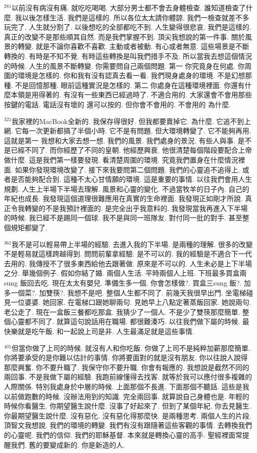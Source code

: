 \documentclass{book}
\begin{document}
$^{281}$以前沒有病沒有痛.
就吃吃喝喝.
大部分男士都不會去身體檢查.
誰知道檢查了什麼.
我以後怎樣生活.
我們是這樣的.
所以各位太太請你體諒.
我們一檢查就差不多玩完了.
人生就分割了.
以後想吃的全部都吃不到.
人生變得很悲哀.
我們是這樣的.
真正的改變不是那些順其自然.
而是我們掌握不到.
頂尖我想說的第一件事.
關於風景的轉變.
就是不論你喜歡不喜歡.
主動或者被動.
有心或者無意.
這些場景是不斷轉換的.
有時是不知不覺.
有時這些轉換是叫我們措手不及.
所以當我去想這個情況的時候.
人生的風景不斷轉變.
你需要問自己兩個問題.
第一 你究竟身在何處.
你周圍的環境是怎樣的.
你和我有沒有認真去看一看.
我們現身處身的環境.
不是幻想那種.
不是回憶那種.
眼前這種實況是怎樣的.
第二 你處身在這種環境裡面.
你還有什麼本領是用得著的.
有沒有一些東西已經過時了.
不適合用的.
大家還會不會用那些按鍵的電話.
電話沒有壞的 還可以按的.
但你會不會用的.
不會用的 為什麼.

$^{321}$我家裡的MacBook全新的.
我保存得很好.
但我都要賣掉它.
為什麼.
它追不到上網.
它每一次更新都搞了半個小時.
它不是有問題.
但大環境轉變了.
它不能夠再用.
這就是第一 我想和大家去想一想.
我們的風景.
我們處身的景況.
有些人與事.
是不是已經不同了.
而你經歷了不同的皇朝.
他經歷興衰.
他很清楚每個階段要配合上帝做什麼.
這是我們第一樣要發現.
看清楚周圍的環境.
究竟我們置身在什麼情況裡面.
如果你發現環境改變了.
接下來我要問第二個問題.
我們的心靈追不追得上.
或者是否能夠配合到.
這種不太心甘情願的環境.
這是重要的事情.
以往我們會用人生規劃.
人生上半場下半場去理解.
風景和心靈的變化.
不過當牧羊的日子內.
自己的年紀也成長.
我發現這個道理很難應用在真實的生命裡面.
我發現正如剛才所說.
真正令我轉變的不是我預計裡面的.
是完全出乎我意料的.
我發現當我再進入下半場的時候.
我已經不是踢同一個球.
我不是與同一班隊友.
對付同一批的對手.
甚至整個規矩都變了.

$^{361}$我不是可以輕易帶上半場的經驗.
去進入我的下半場.
是兩種的理解.
很多的改變不是輕易就這樣跨越得到.
問問前輩拿經驗.
是不可以的.
我的經驗是不適合下一代去用的.
我傳授不了很多東西給他去跟著做.
原來是不可以的.
人生未必是上下半場之分.
舉幾個例子.
假如你結了婚.
兩個人生活.
平時兩個人上班.
下班最多買盒兩sung 飯回去吃.
現在太太有嬰兒.
準備生多一個.
你會怎樣做?.
買盒三sung 飯?.
加多一個菜?.
加雙筷?.
我想不是吧.
整個人生都不同了.
前幾天我很早出門.
坐電梯碰見一位婆婆.
她回家.
在電梯口跟她聊兩句.
見她早上八點定著蒸飯回家.
她說兩句.
老公走了.
現在一盒飯三餐都吃那盒.
我猜少了一個人.
不是少了雙筷那麼簡單.
整個心靈都不同了.
就算這句說話用在職場.
都很難湊巧.
以往我們做下屬的時候.
最快樂就是吃午飯.
和一起說上司是非.
人生最滿足就是這些事情.

$^{401}$但當你做了上司的時候.
就沒有人和你吃飯.
你做了上司不是純粹加薪那麼簡單.
你將要承受的是你難以估計的事情.
你將要面對的就是沒有朋友.
你以往說人說得那麼興奮.
你不要升職了.
我保守你不要升職.
你會有報應的.
我想說是截然不同的兩回事.
不是我做下屬的經驗.
我跑前線懂得去找客.
就等於我可以應付很多複雜的人際關係.
特別我處身於中層的時候.
上面那個不長進.
下面那個不聽話.
這些是我以前做跑數的時候.
沒辦法用到的知識.
完全兩回事.
就算說自己身體也是.
年輕的時候你看醫生.
你期望醫生說什麼.
沒事了好起來了.
但到了某個年紀.
你去見醫生.
你最期望醫生說什麼.
沒有惡化.
沒有惡化得那麼快.
是兩種思考.
兩個人生的片段.
頂智文我想說.
我們的環境的轉變.
我們有沒有跟隨著這些客觀的事情.
去轉換我們的心靈呢.
我們的信仰.
我們的耶穌基督.
本來就是轉換心靈的高手.
聖經裡面常提醒我們.
舊的要變成新的.
你是新造的人.
\end{document}
